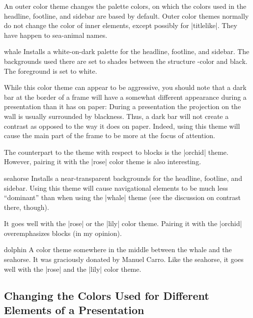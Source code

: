 An outer color theme changes the palette colors, on which the colors
used in the headline, footline, and sidebar 
are based by default. Outer color themes normally do not change the
color of inner elements, except possibly for |titlelike|. They have
happen to sea-animal names. 

\begin{colorthemeexample}{whale}
  Installs a white-on-dark palette for the headline, footline, and
  sidebar. The backgrounds used there are set to shades between the
  structure \beamer-color and black. The foreground is set to
  white.

  While this color theme can appear to be aggressive, you should note
  that a dark bar at the border of a frame will have a somewhat
  different appearance during a presentation than it has on paper:
  During a presentation the projection on the 
  wall is usually surrounded by blackness. Thus, a dark bar will
  not create a contrast as opposed to the way it does on
  paper. Indeed, using this theme will cause the main part of the
  frame to be more at the focus of attention.

  The counterpart to the theme with respect to blocks is the |orchid|
  theme. However, pairing it with the |rose| color theme is also
  interesting. 
\end{colorthemeexample}

\begin{colorthemeexample}{seahorse}
  Installs a near-transparent backgrounds for the headline, footline,
  and sidebar. Using this theme will cause navigational elements to be
  much less ``dominant'' than when using the |whale| theme (see the
  discussion on contrast there, though).

  It goes well with the |rose| or the |lily| color theme. Pairing it
  with the |orchid| overemphasizes blocks (in my opinion).
\end{colorthemeexample}


\begin{colorthemeexample}{dolphin}
  A color theme somewhere in the middle between the whale and the
  seahorse. It was graciously donated by Manuel Carro. Like the
  seahorse, it goes well with the |rose| and the |lily| color theme. 
\end{colorthemeexample}




\subsection{Changing the Colors Used for Different Elements of a Presentation}

